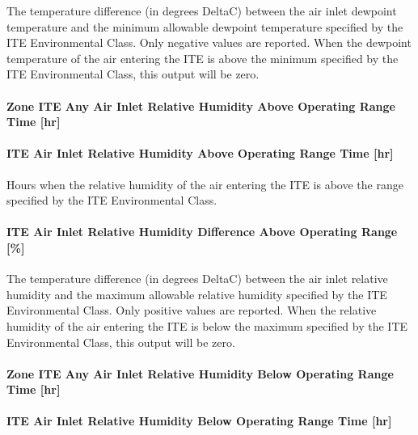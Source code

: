 The temperature difference (in degrees DeltaC) between the air inlet dewpoint temperature and the minimum allowable dewpoint temperature specified by the ITE Environmental Class. Only negative values are reported. When the dewpoint temperature of the air entering the ITE is above the minimum specified by the ITE Environmental Class, this output will be zero.

\paragraph{Zone ITE Any Air Inlet Relative Humidity Above Operating Range Time {[}hr{]}}\label{zone-ite-any-air-inlet-relative-humidity-above-operating-range-time-hr}

\paragraph{ITE Air Inlet Relative Humidity Above Operating Range Time {[}hr{]}}\label{ite-air-inlet-relative-humidity-above-operating-range-time-hr}

Hours when the relative humidity of the air entering the ITE is above the range specified by the ITE Environmental Class.

\paragraph{ITE Air Inlet Relative Humidity Difference Above Operating Range {[}\%{]}}\label{ite-air-inlet-relative-humidity-difference-above-operating-range}

The temperature difference (in degrees DeltaC) between the air inlet relative humidity and the maximum allowable relative humidity specified by the ITE Environmental Class. Only positive values are reported. When the relative humidity of the air entering the ITE is below the maximum specified by the ITE Environmental Class, this output will be zero.

\paragraph{Zone ITE Any Air Inlet Relative Humidity Below Operating Range Time {[}hr{]}}\label{zone-ite-any-air-inlet-relative-humidity-below-operating-range-time-hr}

\paragraph{ITE Air Inlet Relative Humidity Below Operating Range Time {[}hr{]}}\label{ite-air-inlet-relative-humidity-below-operating-range-time-hr}

